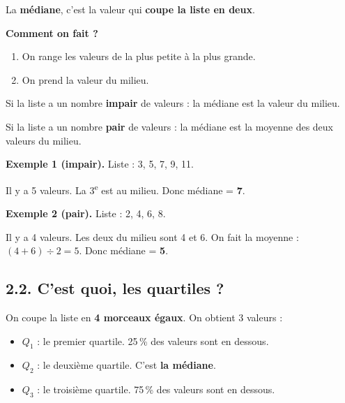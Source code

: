 \documentclass[12pt,a4paper]{article}
\begin{document}
\begin{rappel}
La \textbf{médiane}, c'est la valeur qui \textbf{coupe la liste en deux}.

\vspace{0.2cm}
\textbf{Comment on fait ?}

\vspace{0.2cm}
\begin{enumerate}[leftmargin=*]
  \item On range les valeurs de la plus petite à la plus grande.
  \item On prend la valeur du milieu.
\end{enumerate}

\vspace{0.2cm}
Si la liste a un nombre \textbf{impair} de valeurs : la médiane est la valeur du milieu.

Si la liste a un nombre \textbf{pair} de valeurs : la médiane est la moyenne des deux valeurs du milieu.
\end{rappel}

\begin{enclair}
\textbf{Exemple 1 (impair).} Liste : 3, 5, 7, 9, 11.

Il y a 5 valeurs. La 3\textsuperscript{e} est au milieu. Donc médiane = \textbf{7}.

\vspace{0.2cm}
\textbf{Exemple 2 (pair).} Liste : 2, 4, 6, 8.

Il y a 4 valeurs. Les deux du milieu sont 4 et 6. On fait la moyenne : $(4 + 6) \div 2 = 5$. Donc médiane = \textbf{5}.
\end{enclair}

\subsection*{2.2. C'est quoi, les quartiles ?}

\begin{rappel}
On coupe la liste en \textbf{4 morceaux égaux}. On obtient 3 valeurs :

\vspace{0.2cm}
\begin{itemize}[leftmargin=*]
  \item $Q_1$ : le premier quartile. 25\,\% des valeurs sont en dessous.
  \item $Q_2$ : le deuxième quartile. C'est \textbf{la médiane}.
  \item $Q_3$ : le troisième quartile. 75\,\% des valeurs sont en dessous.
\end{itemize}
\end{rappel}
\end{document}
